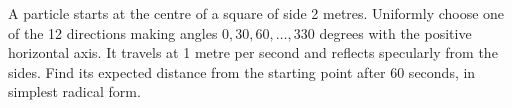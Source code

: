 A particle starts at the centre of a square of side 2 metres. Uniformly choose one of the 12 directions making angles $0,30,60,\ldots,330$ degrees with the positive horizontal axis. It travels at 1 metre per second and reflects specularly from the sides. Find its expected distance from the starting point after 60 seconds, in simplest radical form.
